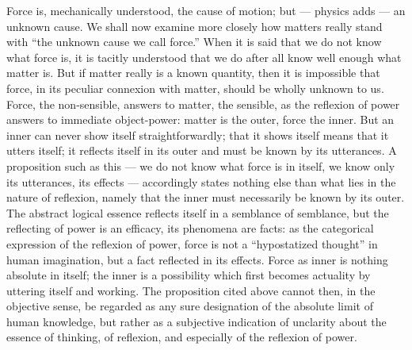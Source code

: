 \documentclass[12pt,a4paper]{book}
\begin{document}
Force is, mechanically understood, the cause of motion; but --- physics adds --- an
unknown cause. We shall now examine more closely how matters really stand with ``the
unknown cause we call force.'' When it is said that we do not know what force is, it is
tacitly understood that we do after all know well enough what matter is. But if matter
really is a known quantity, then it is impossible that force, in its peculiar connexion
with matter, should be wholly unknown to us. Force, the non-sensible, answers to matter,
the sensible, as the reflexion of power answers to immediate object-power: matter is the
outer, force the inner. But an inner can never show itself straightforwardly; that it
shows itself means that it utters itself; it reflects itself in its outer and must be
known by its utterances. A proposition such as this --- we do not know what force is in
itself, we know only its utterances, its effects --- accordingly states nothing else than
what lies in the nature of reflexion, namely that the inner must necessarily be known by
its outer. The abstract logical essence reflects itself in a semblance of semblance, but
the reflecting of power is an efficacy, its phenomena are facts: as the categorical
expression of the reflexion of power, force is not a ``hypostatized thought'' in human
imagination, but a fact reflected in its effects. Force as inner is nothing absolute in
itself; the inner is a possibility which first becomes actuality by uttering itself and
working. The proposition cited above cannot then, in the objective sense, be regarded as
any sure designation of the absolute limit of human knowledge, but rather as a subjective
indication of unclarity about the essence of thinking, of reflexion, and especially of
the reflexion of power.
\end{document}

